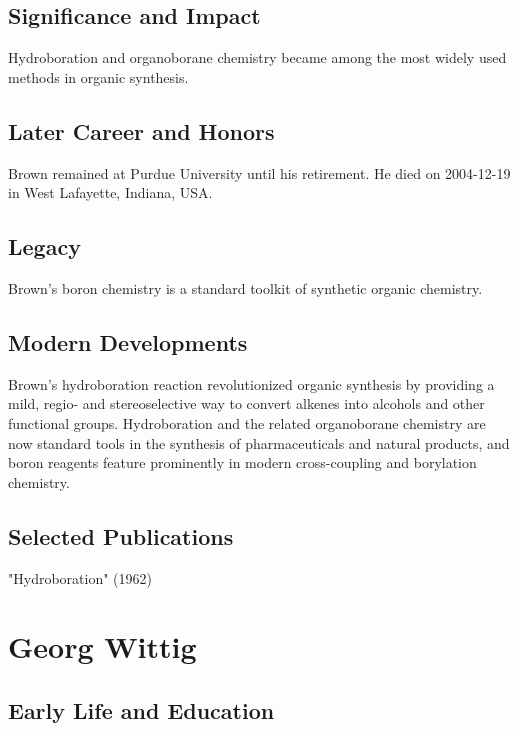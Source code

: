 \subsection*{Significance and Impact}

Hydroboration and organoborane chemistry became among the most widely used methods in organic synthesis.

\subsection*{Later Career and Honors}

Brown remained at Purdue University until his retirement. He died on 2004-12-19 in West Lafayette, Indiana, USA.

\subsection*{Legacy}

Brown's boron chemistry is a standard toolkit of synthetic organic chemistry.

\subsection*{Modern Developments}

Brown's hydroboration reaction revolutionized organic synthesis by providing a mild, regio- and stereoselective way to convert alkenes into alcohols and other functional groups. Hydroboration and the related organoborane chemistry are now standard tools in the synthesis of pharmaceuticals and natural products, and boron reagents feature prominently in modern cross-coupling and borylation chemistry.

\subsection*{Selected Publications}

"Hydroboration" (1962)

\clearpage

\section{Georg Wittig}

\subsection*{Early Life and Education}


